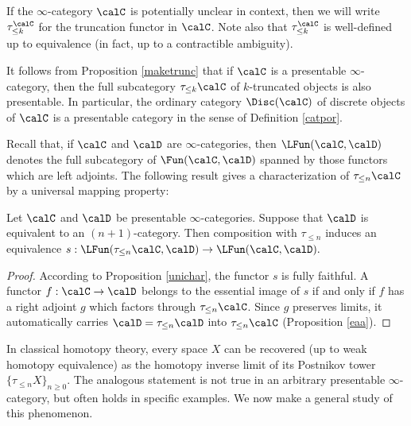 \begin{remark}
If the $\infty$-category $\calC$ is potentially unclear in
context, then we will write $\tau^{\calC}_{\leq k}$ for the truncation
functor in $\calC$. Note also that $\tau^{\calC}_{\leq k}$ is well-defined up to equivalence (in fact, up to a contractible ambiguity).
\end{remark}

\begin{remark}
It follows from Proposition \ref{maketrunc} that if $\calC$ is a presentable $\infty$-category, then the full subcategory $\tau_{\leq k} \calC$ of $k$-truncated objects is also presentable. In particular,
the ordinary category $\Disc(\calC)$ of discrete objects of $\calC$ is a presentable
category in the sense of Definition \ref{catpor}.
\end{remark}

Recall that, if $\calC$ and $\calD$ are $\infty$-categories, then $\LFun(\calC, \calD)$ denotes the full subcategory of $\Fun(\calC,\calD)$ spanned by those functors which are left adjoints.
The following result gives a characterization of $\tau_{\leq n} \calC$ by a universal mapping property:

\begin{corollary}\label{truncprop}
Let $\calC$ and $\calD$ be presentable $\infty$-categories. Suppose that $\calD$ is equivalent to an $(n+1)$-category. Then composition with $\tau_{\leq n}$ induces an equivalence
$s: \LFun( \tau_{\leq n} \calC, \calD) \rightarrow \LFun(\calC, \calD).$
\end{corollary}

\begin{proof}
According to Proposition \ref{unichar}, the functor $s$ is fully faithful. A functor $f: \calC \rightarrow \calD$ belongs to the essential image of $s$ if and only if $f$ has a right adjoint $g$ which
factors through $\tau_{\leq n} \calC$. Since $g$ preserves limits, it automatically carries
$\calD = \tau_{\leq n} \calD$ into $\tau_{\leq n} \calC$ (Proposition \ref{eaa}).
\end{proof}

In classical homotopy theory, every space $X$ can be recovered (up to weak homotopy equivalence) as the homotopy inverse limit of its Postnikov tower $\{ \tau_{\leq n} X \}_{n \geq 0}$.
The analogous statement is not true in an arbitrary presentable $\infty$-category, but often holds in specific examples. We now make a general study of this phenomenon.

